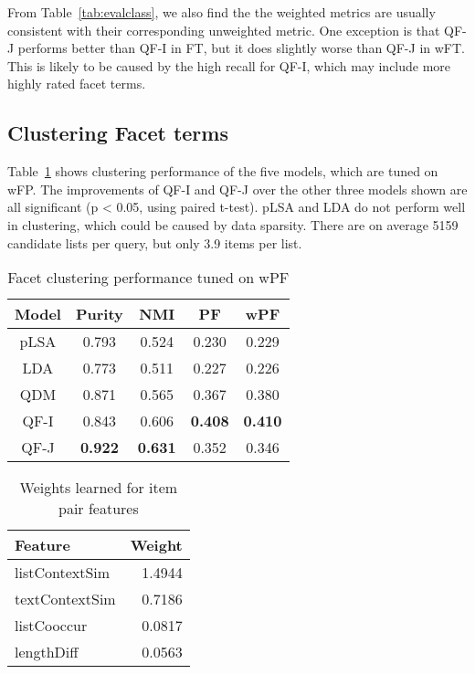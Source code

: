 From Table~\ref{tab:evalclass}, we also find the the weighted metrics are usually consistent with their corresponding unweighted metric.
One exception is that QF-J performs better than QF-I in FT, but it does slightly worse than QF-J in wFT.
This is likely to be caused by the high recall for QF-I, which may include more highly rated facet terms.

\subsection{Clustering Facet terms}
Table~\ref{tab:evalcluster} shows clustering performance of the five models, which are tuned on wFP.
The improvements of QF-I and QF-J over the other three models shown are all significant (p < 0.05, using paired t-test).
pLSA and LDA do not perform well in clustering, which could be caused by data sparsity.
There are on average 5159 candidate lists per query, but only 3.9 items per list.
\begin{table}[ht!]
\centering
\caption{Facet clustering performance tuned on wPF}
\label{tab:evalcluster}
\begin{tabular}{|c|c|c|c|c|} \hline
Model &Purity & NMI & PF & wPF \\ \hline
pLSA &  0.793 & 0.524  &  0.230 & 0.229 \\
LDA  &  0.773 &  0.511 &  0.227 & 0.226 \\
QDM  & 0.871 & 0.565 &  0.367 & 0.380 \\
QF-I  &  0.843 & 0.606 &  \textbf{0.408} & \textbf{0.410} \\
QF-J  & \textbf{0.922} & \textbf{0.631} &  0.352 & 0.346 \\\hline
\end{tabular}
\end{table}

\begin{table}[ht!]
\centering
\caption{Weights learned for item pair features}
\label{tab:fweightsp}
\begin{tabular}{|l|r|} \hline
Feature & Weight \\\hline
listContextSim & 1.4944 \\
textContextSim & 0.7186 \\
listCooccur & 0.0817 \\
lengthDiff & 0.0563 \\\hline
\end{tabular}
\end{table}

